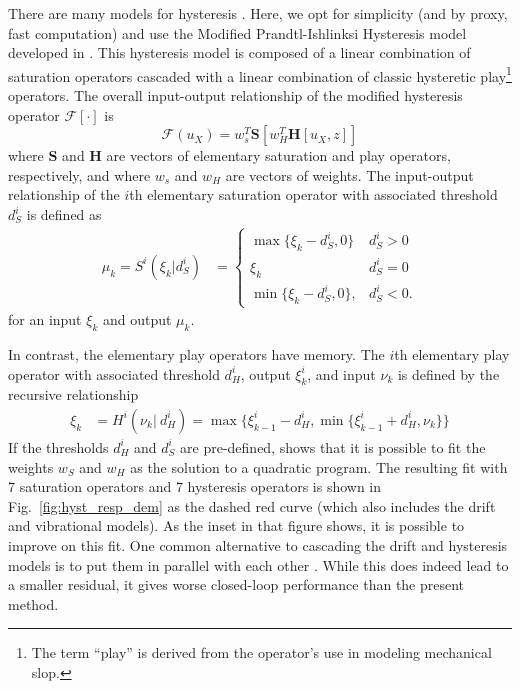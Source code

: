 \documentclass[twocolumn,twoside]{IEEEtran}
\begin{document}
There are many models for hysteresis \cite{croft_creep_1999, rakotondrabe_bouc_2011, Lui_hysteresis_2013}. Here, we opt for simplicity (and by proxy, fast computation) and use the Modified Prandtl-Ishlinksi Hysteresis model developed in \cite{kuhnen_modeling_2003}. This hysteresis model is composed of a linear combination of saturation operators cascaded with a linear combination of classic hysteretic play\footnote{The term ``play'' is derived from the operator's use in modeling mechanical slop.} operators. The overall input-output relationship of the modified hysteresis operator $\mathcal{F}[\cdot]$ is
\begin{equation}
  \mathcal{F}(u_X) = w_s^T\mathbf{S}\left[w_H^T \mathbf{H}[u_X, z]\right]\nonumber
\end{equation}
where $\mathbf{S}$ and $\mathbf{H}$ are vectors of elementary saturation and play operators, respectively, and
where $w_s$ and $w_H$ are vectors of weights. The input-output relationship of the $i$th elementary saturation operator with associated threshold $d_S^i$ is defined as
\begin{align}
  \mu_k=
  S^i(\xi_k| d_S^i) &=
  \begin{cases}
    \max\{\xi_k - d_S^i, 0\} & d_S^i >0\nonumber\\
    \xi_k & d_S^i = 0\nonumber\\
    \min\{\xi_k-d_S^i, 0\},  & d_S^i<0.\nonumber
  \end{cases}
\end{align}
for an input $\xi_k$ and output $\mu_k$. 

In contrast, the elementary play operators have memory. The $i$th elementary play operator with associated threshold $d_H^i$, output $\xi_k^i$, and input $\nu_k$ is defined by the recursive relationship
\begin{align}
  \xi_k &=
  H^i(\nu_k|\: d_H^i) =
  \max\{\xi^i_{k-1}-d_H^i, \min\{\xi^i_{k-1} + d_H^i, \nu_k\} \}\nonumber
\end{align}
If the thresholds $d_H^i$ and $d_S^i$ are pre-defined, \cite{kuhnen_modeling_2003} shows that it is possible to fit the weights $w_S$ and $w_H$ as the solution to a quadratic program. The resulting fit with 7 saturation operators and 7 hysteresis operators is shown in Fig.~\ref{fig:hyst_resp_dem} as the dashed red curve (which also includes the drift and vibrational models). As the inset in that figure shows, it is possible to improve on this fit. One common alternative to cascading the drift and hysteresis models is to put them in parallel with each other \cite{mokaberi_compensation_2008, Krejci_inverse_2001}. While this does indeed lead to a smaller residual, it gives worse closed-loop performance than the present method.
\end{document}
